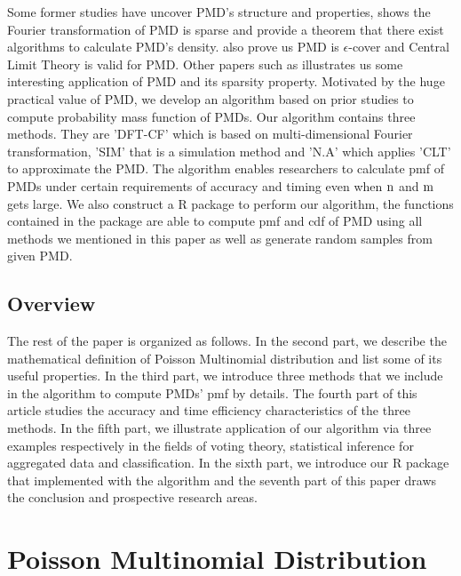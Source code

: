 \documentclass[12pt]{article}
\newcommand{\PMD}{\textrm{PMD}}
\begin{document}


Some former studies have uncover $\PMD$'s structure and properties,  shows the Fourier transformation of $\PMD$ is sparse and provide a theorem that there exist algorithms to calculate PMD's density.  also prove us PMD is $\epsilon$-cover and Central Limit Theory is valid for PMD. Other papers such as  illustrates us some interesting application of PMD and its sparsity property. Motivated by the huge practical value of $\PMD$, we develop an algorithm based on prior studies to compute probability mass function of $\PMD$s. Our algorithm contains three methods. They are 'DFT-CF' which is based on multi-dimensional Fourier transformation, 'SIM' that is a simulation method and 'N.A' which applies 'CLT' to approximate the $\PMD$. The algorithm enables researchers to calculate pmf of $\PMD$s under certain requirements of accuracy and timing even when $\rm n$ and $\rm m$ gets large. We also construct a R package to perform our algorithm, the functions contained in the package are able to compute pmf and cdf of $\PMD$ using all methods we mentioned in this paper as well as generate random samples from given $\PMD$.





\subsection{Overview}
The rest of the paper is organized as follows. In the second part, we describe the mathematical definition of Poisson Multinomial distribution and list some of its useful properties. In the third part, we introduce three methods that we include in the algorithm to compute $\PMD$s' pmf by details. The fourth part of this article studies the accuracy and time efficiency characteristics of the three methods. In the fifth part, we illustrate application of our algorithm via three examples respectively in the fields of voting theory, statistical inference for aggregated data and classification. In the sixth part, we introduce our R package that implemented with the algorithm and the seventh part of this paper draws the conclusion and prospective research areas.



\section{Poisson Multinomial Distribution}
\end{document}
